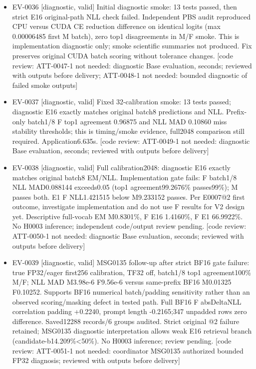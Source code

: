 \documentclass[11pt]{article}
\begin{document}
\begin{itemize}
\item EV-0036 [diagnostic, valid] Initial diagnostic smoke: 13 tests passed, then strict E16 original-path NLL check failed. Independent PBS audit reproduced CPU versus CUDA CE reduction difference on identical logits (max 0.00006485 first M batch), zero top1 disagreements in M/F smoke. This is implementation diagnostic only; smoke scientific summaries not produced. Fix preserves original CUDA batch scoring without tolerance changes. [code review: ATT-0047-1 not needed: diagnostic Base evaluation, seconds; reviewed with outputs before delivery; ATT-0048-1 not needed: bounded diagnostic of failed smoke outputs]
\item EV-0037 [diagnostic, valid] Fixed 32-calibration smoke: 13 tests passed; diagnostic E16 exactly matches original batch8 predictions and NLL. Prefix-only batch1/8 F top1 agreement 0.96875 and NLL MAD 0.10860 miss stability thresholds; this is timing/smoke evidence, full2048 comparison still required. Application6.635s. [code review: ATT-0049-1 not needed: diagnostic Base evaluation, seconds; reviewed with outputs before delivery]
\item EV-0038 [diagnostic, valid] Full calibration2048: diagnostic E16 exactly matches original batch8 EM/NLL. Implementation gate fails: F batch1/8 NLL MAD0.088144 exceeds0.05 (top1 agreement99.2676\% passes99\%); M passes both. E1 F NLL1.421515 below M9.233152 passes. Per E0007@2 first outcome, investigate implementation and do not use F results for V2 design yet. Descriptive full-vocab EM M0.8301\%, F E16 1.4160\%, F E1 66.9922\%. No H0003 inference; independent code/output review pending. [code review: ATT-0050-1 not needed: diagnostic Base evaluation, seconds; reviewed with outputs before delivery]
\item EV-0039 [diagnostic, valid] MSG0135 follow-up after strict BF16 gate failure: true FP32/eager first256 calibration, TF32 off, batch1/8 top1 agreement100\% M/F; NLL MAD M3.98e-6 F9.56e-6 versus same-prefix BF16 M0.01325 F0.10252. Supports BF16 numerical batch/padding sensitivity rather than an observed scoring/masking defect in tested path. Full BF16 F absDeltaNLL correlation padding +0.2240, prompt length -0.2165;347 unpadded rows zero difference. Saved12288 records/6 groups audited. Strict original @2 failure retained; MSG0135 diagnostic interpretation allows weak E16 retrieval branch (candidate-b14.209\%\textless{}50\%). No H0003 inference; review pending. [code review: ATT-0051-1 not needed: coordinator MSG0135 authorized bounded FP32 diagnosis; reviewed with outputs before delivery]

\end{itemize}
\end{document}
